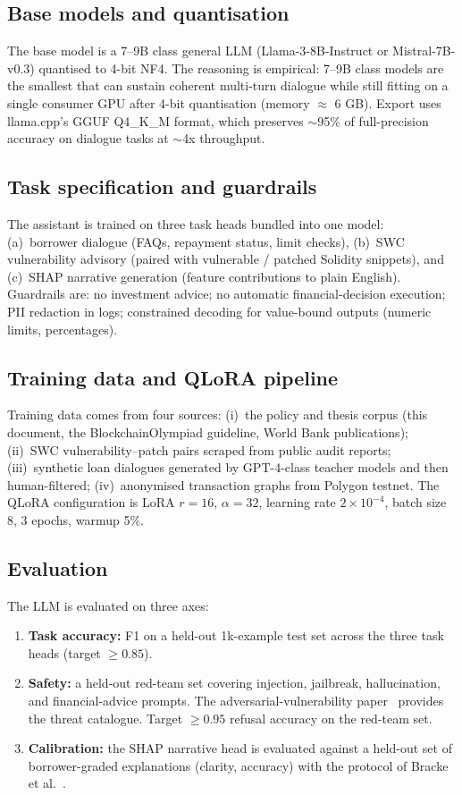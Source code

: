 \documentclass[12pt,a4paper]{report}
\begin{document}
\subsection{Base models and quantisation}
The base model is a 7--9B class general LLM (Llama-3-8B-Instruct or Mistral-7B-v0.3) quantised to 4-bit NF4. The reasoning is empirical: 7--9B class models are the smallest that can sustain coherent multi-turn dialogue while still fitting on a single consumer GPU after 4-bit quantisation (memory $\approx$ 6 GB). Export uses llama.cpp's GGUF Q4\_K\_M format, which preserves $\sim$95\% of full-precision accuracy on dialogue tasks at $\sim$4x throughput.

\subsection{Task specification and guardrails}
The assistant is trained on three task heads bundled into one model: (a)~borrower dialogue (FAQs, repayment status, limit checks), (b)~SWC vulnerability advisory (paired with vulnerable / patched Solidity snippets), and (c)~SHAP narrative generation (feature contributions to plain English). Guardrails are: no investment advice; no automatic financial-decision execution; PII redaction in logs; constrained decoding for value-bound outputs (numeric limits, percentages).

\subsection{Training data and QLoRA pipeline}
Training data comes from four sources: (i)~the policy and thesis corpus (this document, the BlockchainOlympiad guideline, World Bank publications); (ii)~SWC vulnerability--patch pairs scraped from public audit reports; (iii)~synthetic loan dialogues generated by GPT-4-class teacher models and then human-filtered; (iv)~anonymised transaction graphs from Polygon testnet. The QLoRA configuration is LoRA $r=16$, $\alpha=32$, learning rate $2 \times 10^{-4}$, batch size 8, 3 epochs, warmup 5\%.

\subsection{Evaluation}
\label{sec:llm-eval}
The LLM is evaluated on three axes:
\begin{enumerate}[leftmargin=*,itemsep=2pt]
    \item \textbf{Task accuracy:} F1 on a held-out 1k-example test set across the three task heads (target $\geq 0.85$).
    \item \textbf{Safety:} a held-out red-team set covering injection, jailbreak, hallucination, and financial-advice prompts. The adversarial-vulnerability paper~\cite{llmFinanceVuln2025} provides the threat catalogue. Target $\geq 0.95$ refusal accuracy on the red-team set.
    \item \textbf{Calibration:} the SHAP narrative head is evaluated against a held-out set of borrower-graded explanations (clarity, accuracy) with the protocol of Bracke et al.~\cite{bracke2019mlfinance}.
\end{enumerate}
\end{document}
